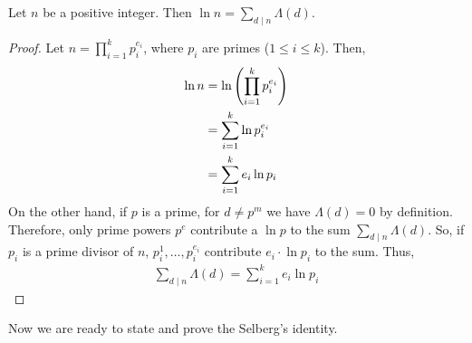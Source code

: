 \begin{theorem}
	\label{thm:vonmangoldt}
	Let $n$ be a positive integer. Then $\ln n=\sum_{d\mid n}\Lambda(d)$.
\end{theorem}

\begin{proof}
	Let $n=\prod_{i=1}^kp_i^{e_i}$, where $p_i$ are primes ($1 \leq i \leq k$). Then,
		\begin{align*}
			\ln n  & =\ln\left(\prod_{i=1}^kp_i^{e_i}\right)\\
					&=\sum_{i=1}^k\ln{p_i^{e_i}}\\
					&=\sum_{i=1}^ke_i\ln p_i
		\end{align*}
	On the other hand, if $p$ is a prime, for $d\neq p^m$ we have $\Lambda(d)=0$ by definition. Therefore, only prime powers $p^e$ contribute a $\ln p$ to the sum $\sum_{d\mid n}\Lambda(d)$. So, if $p_i$ is a prime divisor of $n$, $p_i^1,\ldots,p_i^{e_i}$ contribute $e_i \cdot \ln p_i$ to the sum. Thus,
		\begin{align*}
			\sum_{d\mid n}\Lambda(d) = \sum\limits_{i=1}^ke_i\ln p_i
		\end{align*}

\end{proof}
Now we are ready to state and prove the Selberg's identity.

